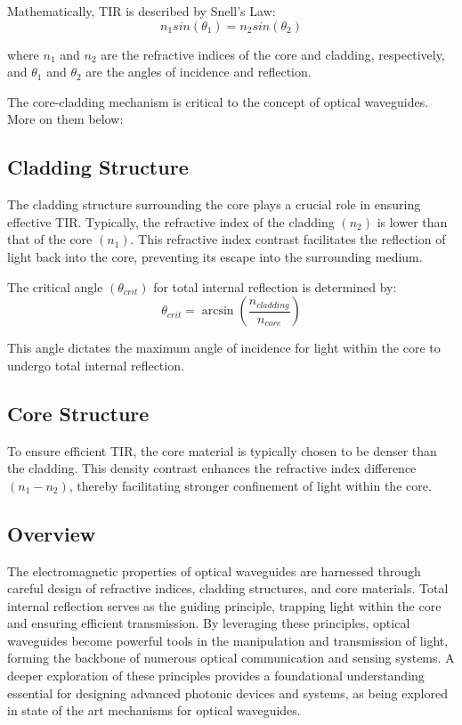 \documentclass[10pt]{article}
\begin{document}
Mathematically, TIR is described by Snell's Law:
\begin{equation}
    n_{1} sin(\theta_{1}) = n_{2} sin(\theta_{2})
\end{equation}

where $n_{1}$ and $n_{2}$ are the refractive indices of the core and cladding, respectively, and $\theta_{1}$ and $\theta_{2}$ are 
the angles of incidence and reflection.

The core-cladding mechanism is critical to the concept of optical waveguides. More on them below:

\subsection{Cladding Structure}

The cladding structure surrounding the core plays a crucial role in ensuring effective TIR. Typically, the refractive index of the cladding
$(n_2)$ is lower than that of the core $(n_1)$. This refractive index contrast facilitates the reflection of light back into the core, preventing its escape into the surrounding medium.

The critical angle $(\theta_{crit})$ for total internal reflection is determined by:
\begin{equation}
    \theta_{crit} = \arcsin(\frac{n_{cladding}}{n_{core}})
\end{equation}

This angle dictates the maximum angle of incidence for light within the core to undergo total internal reflection.

\subsection{Core Structure}
To ensure efficient TIR, the core material is typically chosen to be denser than the cladding. This density contrast enhances the refractive index difference $(n_1 - n_2)$,
thereby facilitating stronger confinement of light within the core.

\subsection{Overview}
The electromagnetic properties of optical waveguides are harnessed through careful design of refractive indices, cladding structures, and core materials. 
Total internal reflection serves as the guiding principle, trapping light within the core and ensuring efficient transmission. 
By leveraging these principles, optical waveguides become powerful tools in the manipulation and transmission of light, 
forming the backbone of numerous optical communication and sensing systems. A deeper exploration of these principles provides a foundational understanding essential for designing advanced photonic 
devices and systems, as being explored in state of the art mechanisms for optical waveguides.
\end{document}

